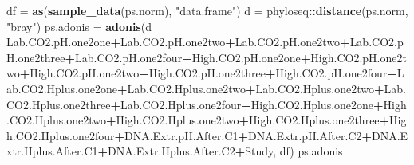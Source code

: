 \documentclass[]{article}
\newenvironment{Shaded}{\begin{snugshade}}{\end{snugshade}}
\newcommand{\KeywordTok}[1]{\textcolor[rgb]{0.13,0.29,0.53}{\textbf{#1}}}
\newcommand{\NormalTok}[1]{#1}
\newcommand{\OperatorTok}[1]{\textcolor[rgb]{0.81,0.36,0.00}{\textbf{#1}}}
\newcommand{\StringTok}[1]{\textcolor[rgb]{0.31,0.60,0.02}{#1}}
\begin{document}
\begin{Shaded}
\begin{Highlighting}[]
\NormalTok{df =}\StringTok{ }\KeywordTok{as}\NormalTok{(}\KeywordTok{sample_data}\NormalTok{(ps.norm), }\StringTok{"data.frame"}\NormalTok{)}
\NormalTok{d =}\StringTok{ }\NormalTok{phyloseq}\OperatorTok{::}\KeywordTok{distance}\NormalTok{(ps.norm, }\StringTok{"bray"}\NormalTok{) }
\NormalTok{ps.adonis =}\StringTok{ }\KeywordTok{adonis}\NormalTok{(d }\OperatorTok{~}\StringTok{ }\NormalTok{Lab.CO2.pH.one2one}\OperatorTok{+}\NormalTok{Lab.CO2.pH.one2two}\OperatorTok{+}\NormalTok{Lab.CO2.pH.one2two}\OperatorTok{+}\NormalTok{Lab.CO2.pH.one2three}\OperatorTok{+}\NormalTok{Lab.CO2.pH.one2four}\OperatorTok{+}\NormalTok{High.CO2.pH.one2one}\OperatorTok{+}\NormalTok{High.CO2.pH.one2two}\OperatorTok{+}\NormalTok{High.CO2.pH.one2two}\OperatorTok{+}\NormalTok{High.CO2.pH.one2three}\OperatorTok{+}\NormalTok{High.CO2.pH.one2four}\OperatorTok{+}\NormalTok{Lab.CO2.Hplus.one2one}\OperatorTok{+}\NormalTok{Lab.CO2.Hplus.one2two}\OperatorTok{+}\NormalTok{Lab.CO2.Hplus.one2two}\OperatorTok{+}\NormalTok{Lab.CO2.Hplus.one2three}\OperatorTok{+}\NormalTok{Lab.CO2.Hplus.one2four}\OperatorTok{+}\NormalTok{High.CO2.Hplus.one2one}\OperatorTok{+}\NormalTok{High.CO2.Hplus.one2two}\OperatorTok{+}\NormalTok{High.CO2.Hplus.one2two}\OperatorTok{+}\NormalTok{High.CO2.Hplus.one2three}\OperatorTok{+}\NormalTok{High.CO2.Hplus.one2four}\OperatorTok{+}\NormalTok{DNA.Extr.pH.After.C1}\OperatorTok{+}\NormalTok{DNA.Extr.pH.After.C2}\OperatorTok{+}\NormalTok{DNA.Extr.Hplus.After.C1}\OperatorTok{+}\NormalTok{DNA.Extr.Hplus.After.C2}\OperatorTok{+}\NormalTok{Study, df)}
\NormalTok{ps.adonis}
\end{Highlighting}
\end{Shaded}
\end{document}

